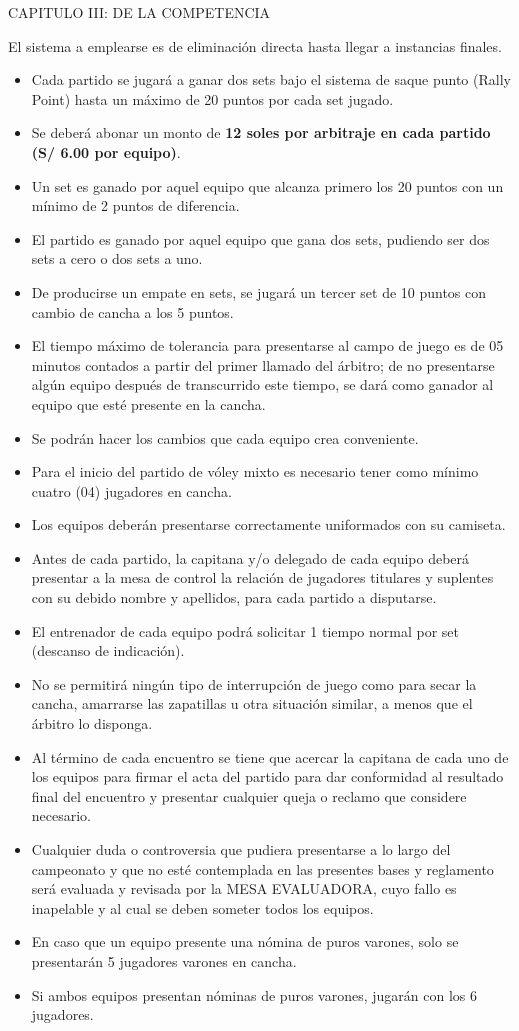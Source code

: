 \documentclass[11pt,a4paper]{article}
\newcommand{\capitulo}[1]{\par\medskip #1\par}
\begin{document}
\capitulo{CAPITULO III: DE LA COMPETENCIA}
El sistema a emplearse es de eliminación directa hasta llegar a instancias finales.
\begin{itemize}
	\item Cada partido se jugará a ganar dos sets bajo el sistema de saque punto (Rally Point) hasta un máximo de 20 puntos por cada set jugado.
	\item Se deberá abonar un monto de \textbf{12 soles por arbitraje en cada partido (S/ 6.00 por equipo)}.
	\item Un set es ganado por aquel equipo que alcanza primero los 20 puntos con un mínimo de 2 puntos de diferencia.
	\item El partido es ganado por aquel equipo que gana dos sets, pudiendo ser dos sets a cero o dos sets a uno.
	\item De producirse un empate en sets, se jugará un tercer set de 10 puntos con cambio de cancha a los 5 puntos.
	\item El tiempo máximo de tolerancia para presentarse al campo de juego es de 05 minutos contados a partir del primer llamado del árbitro; de no presentarse algún equipo después de transcurrido este tiempo, se dará como ganador al equipo que esté presente en la cancha.
	\item Se podrán hacer los cambios que cada equipo crea conveniente.
	\item Para el inicio del partido de vóley mixto es necesario tener como mínimo cuatro (04) jugadores en cancha.
	\item Los equipos deberán presentarse correctamente uniformados con su camiseta.
	\item Antes de cada partido, la capitana y/o delegado de cada equipo deberá presentar a la mesa de control la relación de jugadores titulares y suplentes con su debido nombre y apellidos, para cada partido a disputarse.
	\item El entrenador de cada equipo podrá solicitar 1 tiempo normal por set (descanso de indicación).
	\item No se permitirá ningún tipo de interrupción de juego como para secar la cancha, amarrarse las zapatillas u otra situación similar, a menos que el árbitro lo disponga.
	\item Al término de cada encuentro se tiene que acercar la capitana de cada uno de los equipos para firmar el acta del partido para dar conformidad al resultado final del encuentro y presentar cualquier queja o reclamo que considere necesario.
	\item Cualquier duda o controversia que pudiera presentarse a lo largo del campeonato y que no esté contemplada en las presentes bases y reglamento será evaluada y revisada por la MESA EVALUADORA, cuyo fallo es inapelable y al cual se deben someter todos los equipos.
	\item En caso que un equipo presente una nómina de puros varones, solo se presentarán 5 jugadores varones en cancha.
	\item Si ambos equipos presentan nóminas de puros varones, jugarán con los 6 jugadores.
\end{itemize}
\end{document}
